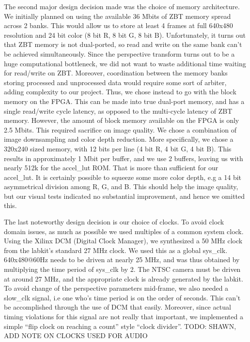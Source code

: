 \documentclass{article}
\begin{document}
The second major design decision made was the choice of memory architecture.
We initially planned on using the available 36 Mbits of ZBT memory spread across 2 banks.
This would allow us to store at least 4 frames at full 640x480 resolution and 24 bit color (8 bit R, 8 bit G, 8 bit B).
Unfortunately, it turns out that ZBT memory is not dual-ported, so read and write on the same bank can't be achieved simultaneously.
Since the perspective transform turns out to be a huge computational bottleneck, we did not want to waste additional time waiting for read/write on ZBT.
Moreover, coordination between the memory banks storing processed and unprocessed data would require some sort of arbiter, adding complexity to our project.
Thus, we chose instead to go with the block memory on the FPGA.
This can be made into true dual-port memory, and has a single read/write cycle latency, as opposed to the multi-cycle latency of ZBT memory.
However, the amount of block memory available on the FPGA is only 2.5 Mbits.
This required sacrifice on image quality.
We chose a combination of image downsampling and color depth reduction.
More specifically, we chose a 320x240 sized memory, with 12 bits per line (4 bit R, 4 bit G, 4 bit B).
This results in approximately 1 Mbit per buffer, and we use 2 buffers, leaving us with nearly 512k for the accel\_lut ROM.
That is more than sufficient for our accel\_lut.
It is certainly possible to squeeze some more color depth, e.g a 14 bit asymmetrical division among R, G, and B.
This should help the image quality, but our visual tests indicated no substantial improvement, and hence we omitted this.

The last noteworthy design decision is our choice of clocks.
To avoid clock domain issues, as much as possible we used multiples of a common system clock.
Using the Xilinx DCM (Digital Clock Manager), we synthesized a 50 MHz clock from the labkit's standard 27 MHz clock.
We used this as a global sys\_clk.
640x480@60Hz needs to be driven at nearly 25 MHz, and was thus obtained by multiplying the time period of sys\_clk by 2.
The NTSC camera must be driven at around 27 MHz, and the appropriate clock is already generated by the labkit.
To avoid change of the perspective parameters mid-frame, we also needed a slow\_clk signal,
i.e one who's time period is on the order of seconds.
This can't be accomplished through the use of DCM that easily.
Moreover, since actual timing violations for this signal are not really that important,
we implemented a simple ``flip clock on reaching a count'' style ``clock divider''.
TODO: SHAWN, ADD NOTE ON CLOCKS USED FOR AUDIO
\end{document}
